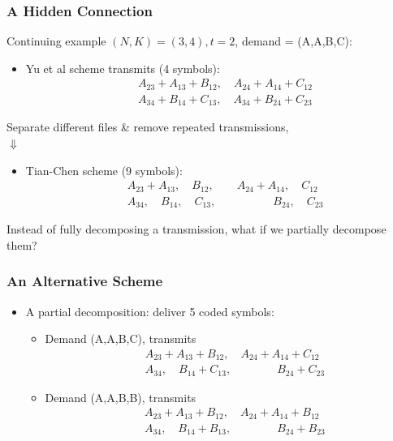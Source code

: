 \documentclass{beamer}
\begin{document}
\begin{frame}
\frametitle{A Hidden Connection}
Continuing example $(N,K)=(3,4), t=2$, demand = (A,A,B,C):

\begin{itemize}
\item Yu et al scheme transmits (4 symbols):
\begin{align*}
& A_{23} +A_{13}+B_{12}, \quad  A_{24} +A_{14}+C_{12} \\
& A_{34} +B_{14}+C_{13} ,\quad  A_{34} +B_{24}+C_{23}
\end{align*}
\end{itemize}
\centering
Separate different files \& remove repeated transmissions, \\
$\Downarrow$
\begin{itemize}
\item Tian-Chen scheme (9 symbols):
\begin{align*}
& A_{23} +A_{13}, \quad B_{12}, \qquad  A_{24} +A_{14}, \quad C_{12} \\
& A_{34}, \quad B_{14}, \quad C_{13}, \qquad  \qquad \quad B_{24}, \quad C_{23}
\end{align*}
\end{itemize}
Instead of fully decomposing a transmission, what if we partially decompose them?
\end{frame}


\begin{frame}
\frametitle{An Alternative Scheme}
\begin{itemize}
\item A partial decomposition: deliver 5 coded symbols:
	\begin{itemize}
	[circle]
	\item Demand (A,A,B,C), transmits
	\begin{align*}
	& A_{23} +A_{13}+B_{12}, \quad  A_{24} +A_{14}+C_{12} \\
	& A_{34}, \quad B_{14}+C_{13} ,\qquad \qquad B_{24}+C_{23}
	\end{align*}
	\item Demand (A,A,B,B), transmits
	\begin{align*}
	& A_{23} +A_{13}+B_{12}, \quad  A_{24} +A_{14}+B_{12} \\
	& A_{34}, \quad B_{14}+B_{13} ,\qquad \qquad B_{24}+B_{23}
	\end{align*}
	\end{itemize}
\end{itemize}
\end{frame}
\end{document}
